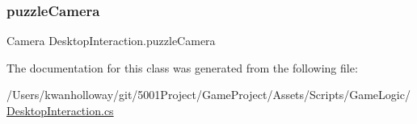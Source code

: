 \mbox{\label{class_desktop_interaction_acf4984e2694edc76dd5fa0ca18559d76}} 
\subsubsection{\texorpdfstring{puzzle\+Camera}{puzzleCamera}}
{\footnotesize\ttfamily Camera Desktop\+Interaction.\+puzzle\+Camera}



The documentation for this class was generated from the following file\+:\begin{DoxyCompactItemize}
\item 
/\+Users/kwanholloway/git/5001\+Project/\+Game\+Project/\+Assets/\+Scripts/\+Game\+Logic/\hyperlink{_desktop_interaction_8cs}{Desktop\+Interaction.\+cs}\end{DoxyCompactItemize}
